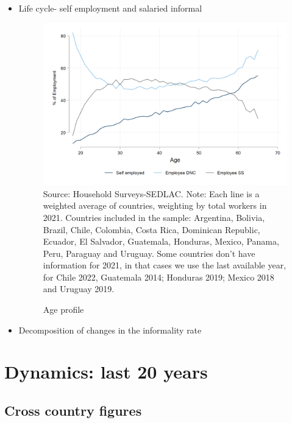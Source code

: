\documentclass[english]{article}
\begin{document}
\begin{itemize}
\begin{itemize}
\item Life cycle- self employment and salaried informal
 \begin{figure}[!htb]
        \justifying
        \caption{Age profile}     
        \includegraphics[scale=.3]{latex/figures/Snapshot/age_profile.png}
        \label{fig:age_pro}
        \footnotesize{Source: Household Surveys-SEDLAC.}
        \footnotesize{Note: Each line is a weighted average of countries, weighting by total workers in 2021. Countries included in the sample: Argentina, Bolivia, Brazil, Chile, Colombia, Costa Rica, Dominican Republic, Ecuador, El Salvador, Guatemala, Honduras, Mexico, Panama, Peru, Paraguay and Uruguay. Some countries don’t have information for 2021, in that cases we use the last available year, for Chile 2022, Guatemala 2014; Honduras 2019; Mexico 2018 and Uruguay 2019.}
        \end{figure}
\item Decomposition of changes in the informality rate

\end{itemize}

     
     
\section{Dynamics: last 20 years}  

\subsection{Cross country figures}

\end{itemize}
\end{document}
